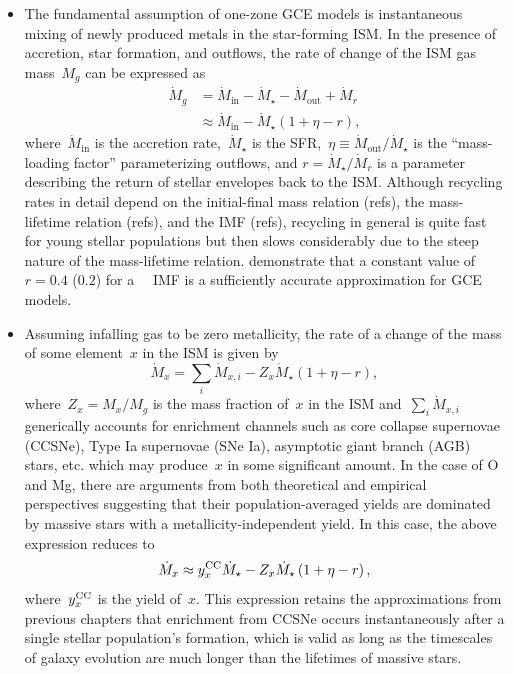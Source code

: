 \begin{itemize}

	\item The fundamental assumption of one-zone GCE models is instantaneous
	mixing of newly produced metals in the star-forming ISM.
	In the presence of accretion, star formation, and outflows, the rate of
	change of the ISM gas mass~$M_g$ can be expressed as
	\begin{equation}\begin{split}
	\dot{M}_g &= \dot{M}_\text{in} - \dot{M}_\star - \dot{M}_\text{out} +
	\dot{M}_r
	\\
	&\approx \dot{M}_\text{in} - \dot{M}_\star(1 + \eta - r),
	\end{split}\end{equation}
	where~$\dot{M}_\text{in}$ is the accretion rate,~$\dot{M}_\star$ is the
	SFR,~$\eta \equiv \dot{M}_\text{out} / \dot{M}_\star$ is the
	``mass-loading factor'' parameterizing outflows, and
	$r = \dot{M}_\star / \dot{M}_r$ is a parameter describing the return of
	stellar envelopes back to the ISM.
	Although recycling rates in detail depend on the initial-final mass
	relation {\color{red} (refs)}, the mass-lifetime relation {\color{red}
	(refs)}, and the IMF {\color{red} (refs)}, recycling in general is quite
	fast for young stellar populations but then slows considerably due to the
	steep nature of the mass-lifetime relation.
	\citet{Weinberg2017b} demonstrate that a constant value of~$r = 0.4$
	($0.2$) for a~\citet{Kroupa2001}~\citep{Salpeter1955} IMF is a sufficiently
	accurate approximation for GCE models.

	\item Assuming infalling gas to be zero metallicity, the rate of a change
	of the mass of some element~$x$ in the ISM is given by
	\begin{equation}
	\dot{M}_x = \sum_i \dot{M}_{x,i} - Z_x \dot{M}_\star
	\left(1 + \eta - r\right),
	\end{equation}
	where~$Z_x = M_x / M_g$ is the mass fraction of~$x$ in the ISM
	and~$\sum_i \dot{M}_{x,i}$ generically accounts for enrichment channels
	such as core collapse supernovae (CCSNe), Type Ia supernovae (SNe Ia),
	asymptotic giant branch (AGB) stars, etc. which may produce~$x$ in some
	significant amount.
	In the case of O and Mg, there are arguments from both theoretical
	\citep[e.g.,][]{Andrews2017, Limongi2018} and empirical
	\citep{Griffith2019, Griffith2022, Weinberg2019, Weinberg2022}
	perspectives suggesting that their population-averaged yields are dominated
	by massive stars with a metallicity-independent yield.
	In this case, the above expression reduces to
	\begin{equation}
	\dot{M}_x \approx y_\text{$x$}^\text{CC} \dot{M}_\star - Z_x \dot{M}_\star
	\left(1 + \eta - r\right),
	\end{equation}
	where~$y_\text{$x$}^\text{CC}$ is the yield of~$x$.
	This expression retains the approximations from {\color{red} previous
	chapters} that enrichment from CCSNe occurs instantaneously after a single
	stellar population's formation, which is valid as long as the timescales of
	galaxy evolution are much longer than the lifetimes of massive stars.


\end{itemize}

